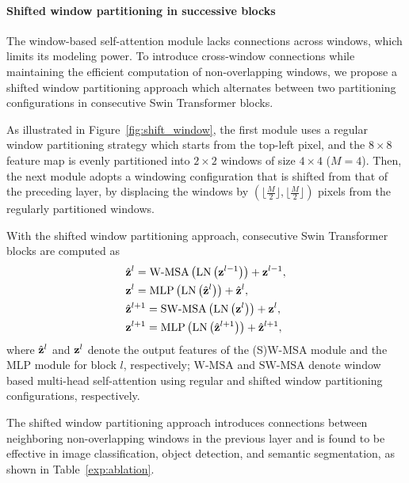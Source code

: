 \documentclass[10pt,twocolumn,letterpaper]{article}
\begin{document}
\paragraph{Shifted window partitioning in successive blocks} The window-based self-attention module lacks connections across windows, which limits its modeling power. To introduce cross-window connections while maintaining the efficient computation of non-overlapping windows, we propose a shifted window partitioning approach which alternates between two partitioning configurations in consecutive Swin Transformer blocks.

As illustrated in Figure~\ref{fig:shift_window}, the first module uses a regular window partitioning strategy which starts from the top-left pixel, and the $8\times 8$ feature map is evenly partitioned into $2\times2$ windows of size $4\times4$ ($M=4$). Then, the next module adopts a windowing configuration that is shifted from that of the preceding layer, by displacing the windows by $ (\lfloor\frac{M}{2} \rfloor, \lfloor\frac{M}{2} \rfloor)$ pixels from the regularly partitioned windows. 

With the shifted window partitioning approach, consecutive Swin Transformer blocks are computed as
\begin{align}
    &{{\hat{\bf{z}}}^{l}} = \text{W-MSA}\left( {\text{LN}\left( {{{\bf{z}}^{l - 1}}} \right)} \right) + {\bf{z}}^{l - 1},\nonumber\\
    &{{\bf{z}}^l} = \text{MLP}\left( {\text{LN}\left( {{{\hat{\bf{z}}}^{l}}} \right)} \right) + {{\hat{\bf{z}}}^{l}},\nonumber\\
    &{{\hat{\bf{z}}}^{l+1}} = \text{SW-MSA}\left( {\text{LN}\left( {{{\bf{z}}^{l}}} \right)} \right) + {\bf{z}}^{l}, \nonumber\\
    &{{\bf{z}}^{l+1}} = \text{MLP}\left( {\text{LN}\left( {{{\hat{\bf{z}}}^{l+1}}} \right)} \right) + {{\hat{\bf{z}}}^{l+1}}, \label{eq.swin}
\end{align}
where ${\hat{\bf{z}}}^l$ and ${\bf{z}}^l$ denote the output features of the (S)W-MSA module and the MLP module for block $l$, respectively; $\text{W-MSA}$ and $\text{SW-MSA}$ denote window based multi-head self-attention using regular and shifted window partitioning configurations, respectively.

The shifted window partitioning approach introduces connections between neighboring non-overlapping windows in the previous layer and is found to be effective in image classification, object detection, and semantic segmentation, as shown in Table~\ref{exp:ablation}.
\end{document}
